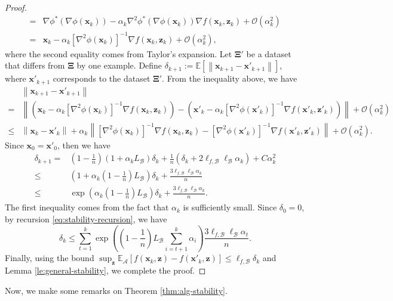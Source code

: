 \documentclass[twoside,11pt]{article}
\newcommand{\E}{\mathbb{E}}
\newcommand{\cA}{\mathcal A}
\newcommand{\cB}{\mathcal B}
\def\norm#1{\left\|#1\right\|}
\def\vx{{\bm{x}}}
\def\vz{{\bm{z}}}
\begin{document}
{\begin{proof}
\[\begin{aligned}
=&\nabla\phi^*(\nabla\phi(\vx_k))-\alpha_k\nabla^2\phi^*(\nabla\phi(\vx_k))\nabla f(\vx_k,\vz_k)+\mathcal{O}(\alpha_k^2)\\
=&\vx_k-\alpha_k[\nabla^2\phi(\vx_k)]^{-1}\nabla f(\vx_k,\vz_k)+\mathcal{O}(\alpha_k^2),
\end{aligned}
\]
where the second equality comes from Taylor's expansion. Let $\bm\Xi'$ be a dataset that differs from $\bm\Xi$ by one example. Define $\delta_{k+1}:=\E\left[\norm{\vx_{k+1}-\vx'_{k+1}}\right]$, where $\vx'_{k+1}$ corresponds to the dataset $\bm\Xi'$. From the inequality above, we have 
\[
\begin{aligned}
&\norm{\vx_{k+1}-\vx'_{k+1}}\\
=&\norm{\left(\vx_k-\alpha_k[\nabla^2\phi(\vx_k)]^{-1}\nabla f(\vx_k,\vz_k)\right)-\left(\vx'_k-\alpha_k[\nabla^2\phi(\vx'_k)]^{-1}\nabla f(\vx'_k,\vz'_k)\right)}+\mathcal{O}(\alpha_k^2)\\
\leq&\norm{\vx_k-\vx'_k}+\alpha_k\norm{[\nabla^2\phi(\vx_k)]^{-1}\nabla f(\vx_k,\vz_k)-[\nabla^2\phi(\vx'_k)]^{-1}\nabla f(\vx'_k,\vz'_k)}+\mathcal{O}(\alpha_k^2).
\end{aligned}
\]
Since $\vx_0=\vx'_0$, then we have
\begin{equation}
\begin{aligned}
\delta_{k+1}=&\left(1-\frac{1}{n}\right)\left(1+\alpha_kL_{\cB}\right)\delta_k+\frac{1}{n}\left(\delta_k+2\ell_{f,\cB}\ell_{\cB}\alpha_k\right)+C\alpha_k^2\\
\leq&\left(1+\alpha_k\left(1-\frac{1}{n}\right)L_{\cB}\right)\delta_k+\frac{3\ell_{f,\cB}\ell_{\cB}\alpha_k}{n}\\
\leq&\exp\left(\alpha_k\left(1-\frac{1}{n}\right)L_{\cB}\right)\delta_k+\frac{3\ell_{f,\cB}\ell_{\cB}\alpha_k}{n}.
\end{aligned}
\label{eq:stability-recursion}
\end{equation}
The first inequality comes from the fact that $\alpha_k$ is sufficiently small. Since $\delta_0=0$, by recursion \eqref{eq:stability-recursion}, we have 
\[
\delta_k\leq\sum_{t=1}^k\exp\left(\left(1-\frac{1}{n}\right)L_{\cB}\sum_{i=t+1}^k\alpha_i\right)\frac{3\ell_{f,\cB}\ell_{\cB}\alpha_t}{n}. 
\]
Finally, using the bound $\sup_{\vz}\E_{\cA}[f(\vx_k,\vz)-f(\vx'_k,\vz)]\leq\ell_{f,\cB}\delta_k$ and Lemma \ref{le:general-stability}, we complete the proof.
\end{proof}
Now, we make some remarks on Theorem \ref{thm:alg-stability}. 
\begin{remark}
\begin{enumerate}

\end{enumerate}
\end{remark}}
\end{document}
